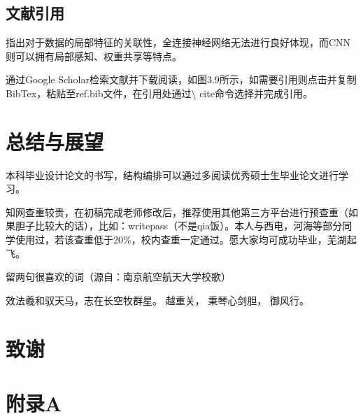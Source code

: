 \documentclass[a4paper,AutoFakeBold,oneside,12pt]{book}
\begin{document}
\section{文献引用}
\citeauthor{lecun1995convolutional}指出对于数据的局部特征的关联性，全连接神经网络无法进行良好体现，而CNN则可以拥有局部感知、权重共享等特点\cite{lecun1995convolutional}。

通过Google Scholar检索文献并下载阅读，如图3.9所示，如需要引用则点击并复制BibTex，粘贴至ref.bib文件，在引用处通过$\setminus$ cite命令选择并完成引用。

\chapter{总结与展望}
本科毕业设计论文的书写，结构编排可以通过多阅读优秀硕士生毕业论文进行学习。

知网查重较贵，在初稿完成老师修改后，推荐使用其他第三方平台进行预查重（如果胆子比较大的话），比如：writepass（不是qia饭）。本人与西电，河海等部分同学使用过，若该查重低于20\%，校内查重一定通过。愿大家均可成功毕业，芜湖起飞。


留两句很喜欢的词（源自：南京航空航天大学校歌）

效法羲和驭天马，志在长空牧群星。
越重关， 秉琴心剑胆， 御风行。


\clearpage{}
\chapter*{致\qquad{}谢}
\normalsize\thankwords



\clearpage{}




\setcounter{figure}{0} 
\renewcommand{\thefigure}{~附-\arabic{figure}~}
\setcounter{equation}{0} 
\renewcommand{\theequation}{~附-\arabic{equation}~}
\setcounter{table}{0} 
\renewcommand{\thetable}{~附-\arabic{table}~}
\setcounter{lstlisting}{0} 
\makeatletter
  \renewcommand \thelstlisting
       {附-\@arabic\c@lstlisting}
\makeatother


\chapter*{附录A}
\end{document}
